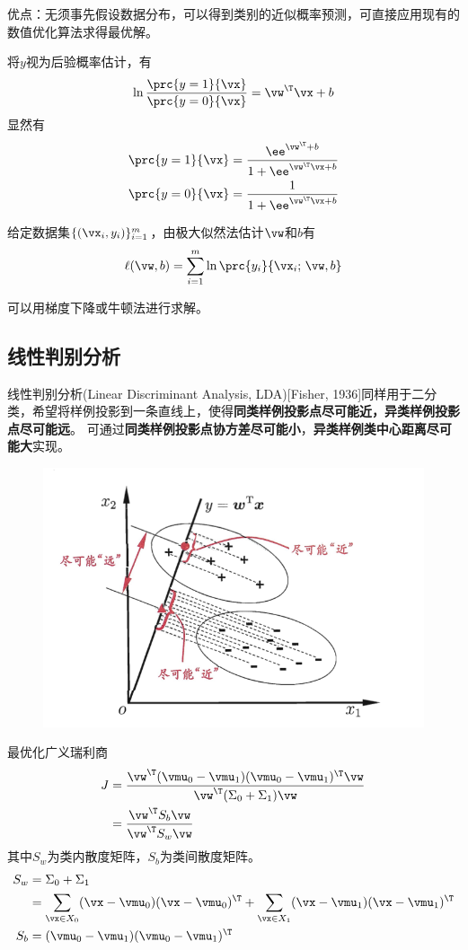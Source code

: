 优点：无须事先假设数据分布，可以得到类别的近似概率预测，可直接应用现有的数值优化算法求得最优解。

将$y$视为后验概率估计，有
\[\ln\frac{\prc{y=1}{\vx}}{\prc{y=0}{\vx}}=\vw^\T\vx+b\]
显然有
\[\begin{aligned}
\prc{y=1}{\vx}&=\frac{\ee^{\vw^\T+b}}{1+\ee^{\vw^\T\vx+b}}\\
\prc{y=0}{\vx}&=\frac{1}{1+\ee^{\vw^\T\vx+b}}
\end{aligned}\]

给定数据集$\{(\vx_i,y_i)\}_{i=1}^m$，由极大似然法估计$\vw$和$b$有
\[\ell(\vw,b)=\sum_{i=1}^m\ln\prc{y_i}{\vx_i;\,\vw,b}\]

可以用梯度下降或牛顿法进行求解。

\subsection{线性判别分析}
线性判别分析(Linear Discriminant Analysis, LDA)[Fisher, 1936]同样用于二分类，希望将样例投影到一条直线上，使得\textbf{同类样例投影点尽可能近，异类样例投影点尽可能远}。
可通过\textbf{同类样例投影点协方差尽可能小}，\textbf{异类样例类中心距离尽可能大}实现。
\begin{figure}[H]
\centering
\includegraphics[width=0.5\linewidth]{fig/LDA.png}
\end{figure}

最优化广义瑞利商
\[\begin{aligned}
J &= \frac{\vw^\T(\vmu_0-\vmu_1)(\vmu_0-\vmu_1)^\T\vw}{\vw^\T(\Sigma_0+\Sigma_1)\vw}\\
&= \frac{\vw^\T S_b\vw}{\vw^\T S_w\vw}
\end{aligned}\]
其中$S_w$为类内散度矩阵，$S_b$为类间散度矩阵。
\[\begin{aligned}
S_w &= \Sigma_0 + \Sigma_1\\
&= \sum_{\vx\in X_0}(\vx-\vmu_0)(\vx-\vmu_0)^\T
+ \sum_{\vx\in X_1}(\vx-\vmu_1)(\vx-\vmu_1)^\T\\
S_b &= (\vmu_0-\vmu_1)(\vmu_0-\vmu_1)^\T
\end{aligned}\]

